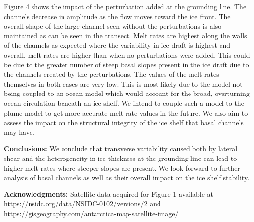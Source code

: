 \documentclass[10pt]{article}{\twocolumn}
\begin{document}
\newline
Figure 4 shows the impact of the perturbation added at the grounding line. The channels decrease in amplitude as the flow moves toward the ice front. The overall shape of the large channel seen without the perturbations is also maintained as can be seen in the transect. Melt rates are highest along the walls of the channels as expected where the variability in ice draft is highest and overall, melt rates are higher than when no perturbations were added. This could be due to the greater number of steep basal slopes present in the ice draft due to the channels created by the perturbations. 
\newline
The values of the melt rates themselves in both cases are very low. This is most likely due to the model not being coupled to an ocean model which would account for the broad, overturning ocean circulation beneath an ice shelf. We intend to couple such a model to the plume model to get more accurate melt rate values in the future. We also aim to assess the impact on the structural integrity of the ice shelf that basal channels may have.
\newline

\indent
\textbf{Conclusions:}
We conclude that transverse variability caused both by lateral shear and the heterogeneity in ice thickness at the grounding line can lead to higher melt rates where steeper slopes are present. We look forward to further analysis of basal channels as well as their overall impact on the ice shelf stability.
\newline

\indent
\textbf{Acknowledgments:}
Satellite data acquired for Figure 1 available at https://nsidc.org/data/NSIDC-0102/versions/2 and https://gisgeography.com/antarctica-map-satellite-image/



\enddocument
\end{document}
